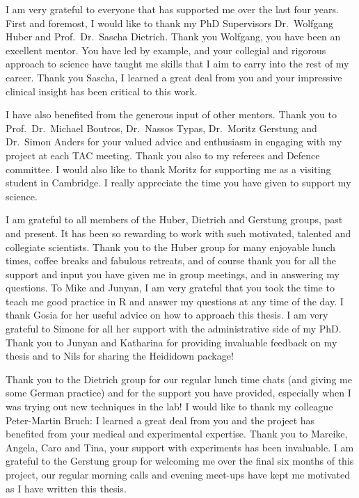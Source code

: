 \documentclass[11pt, a4paper, twosided]{book}
\begin{document}
I am very grateful to everyone that has supported me over the last four years. First and foremost, I would like to thank my PhD Supervisors Dr.~Wolfgang Huber and Prof.~Dr.~Sascha Dietrich. Thank you Wolfgang, you have been an excellent mentor. You have led by example, and your collegial and rigorous approach to science have taught me skills that I aim to carry into the rest of my career. Thank you Sascha, I learned a great deal from you and your impressive clinical insight has been critical to this work.

I have also benefited from the generous input of other mentors. Thank you to Prof.~Dr.~Michael Boutros, Dr.~Nassos Typas, Dr.~Moritz Gerstung and Dr.~Simon Anders for your valued advice and enthusiasm in engaging with my project at each TAC meeting. Thank you also to my referees and Defence committee. I would also like to thank Moritz for supporting me as a visiting student in Cambridge. I really appreciate the time you have given to support my science.

I am grateful to all members of the Huber, Dietrich and Gerstung groups, past and present. It has been so rewarding to work with such motivated, talented and collegiate scientists. Thank you to the Huber group for many enjoyable lunch times, coffee breaks and fabulous retreats, and of course thank you for all the support and input you have given me in group meetings, and in answering my questions. To Mike and Junyan, I am very grateful that you took the time to teach me good practice in R and answer my questions at any time of the day. I thank Gosia for her useful advice on how to approach this thesis. I am very grateful to Simone for all her support with the administrative side of my PhD. Thank you to Junyan and Katharina for providing invaluable feedback on my thesis and to Nils for sharing the Heididown package!

Thank you to the Dietrich group for our regular lunch time chats (and giving me some German practice) and for the support you have provided, especially when I was trying out new techniques in the lab! I would like to thank my colleague Peter-Martin Bruch: I learned a great deal from you and the project has benefited from your medical and experimental expertise. Thank you to Mareike, Angela, Caro and Tina, your support with experiments has been invaluable. I am grateful to the Gerstung group for welcoming me over the final six months of this project, our regular morning calls and evening meet-ups have kept me motivated as I have written this thesis.
\end{document}
